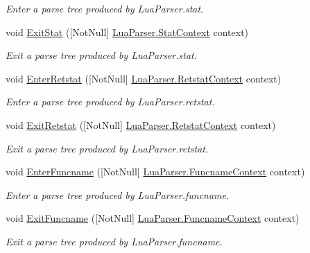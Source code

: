 \begin{DoxyCompactItemize}
\begin{DoxyCompactList}\small\item\em Enter a parse tree produced by Lua\+Parser.\+stat. \end{DoxyCompactList}\item 
void \mbox{\hyperlink{interfacezlua_1_1_i_lua_listener_adb5cede64711480ae76ce5eece644ee4}{Exit\+Stat}} (\mbox{[}Not\+Null\mbox{]} \mbox{\hyperlink{classzlua_1_1_lua_parser_1_1_stat_context}{Lua\+Parser.\+Stat\+Context}} context)
\begin{DoxyCompactList}\small\item\em Exit a parse tree produced by Lua\+Parser.\+stat. \end{DoxyCompactList}\item 
void \mbox{\hyperlink{interfacezlua_1_1_i_lua_listener_a0035b00baa60225e9b546903bf41835e}{Enter\+Retstat}} (\mbox{[}Not\+Null\mbox{]} \mbox{\hyperlink{classzlua_1_1_lua_parser_1_1_retstat_context}{Lua\+Parser.\+Retstat\+Context}} context)
\begin{DoxyCompactList}\small\item\em Enter a parse tree produced by Lua\+Parser.\+retstat. \end{DoxyCompactList}\item 
void \mbox{\hyperlink{interfacezlua_1_1_i_lua_listener_a4f4bc76c085e375c69f6c34491670d9e}{Exit\+Retstat}} (\mbox{[}Not\+Null\mbox{]} \mbox{\hyperlink{classzlua_1_1_lua_parser_1_1_retstat_context}{Lua\+Parser.\+Retstat\+Context}} context)
\begin{DoxyCompactList}\small\item\em Exit a parse tree produced by Lua\+Parser.\+retstat. \end{DoxyCompactList}\item 
void \mbox{\hyperlink{interfacezlua_1_1_i_lua_listener_a17d342070a88fadc98dec2456e2ba0dc}{Enter\+Funcname}} (\mbox{[}Not\+Null\mbox{]} \mbox{\hyperlink{classzlua_1_1_lua_parser_1_1_funcname_context}{Lua\+Parser.\+Funcname\+Context}} context)
\begin{DoxyCompactList}\small\item\em Enter a parse tree produced by Lua\+Parser.\+funcname. \end{DoxyCompactList}\item 
void \mbox{\hyperlink{interfacezlua_1_1_i_lua_listener_aeae3611ef79ccd5c902a1016ebc2f6e4}{Exit\+Funcname}} (\mbox{[}Not\+Null\mbox{]} \mbox{\hyperlink{classzlua_1_1_lua_parser_1_1_funcname_context}{Lua\+Parser.\+Funcname\+Context}} context)
\begin{DoxyCompactList}\small\item\em Exit a parse tree produced by Lua\+Parser.\+funcname. \end{DoxyCompactList}\item 

\end{DoxyCompactItemize}
